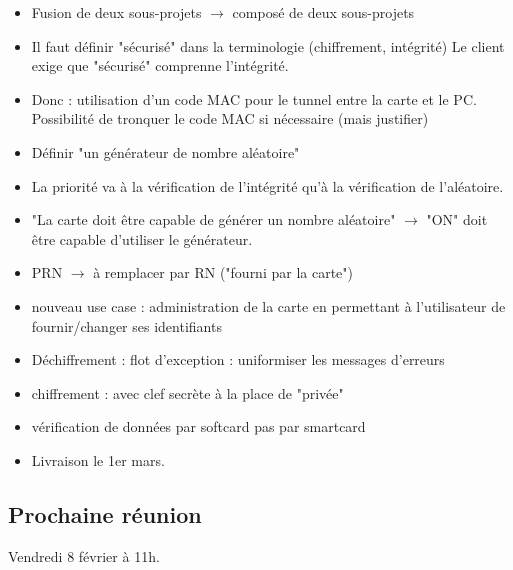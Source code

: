 \documentclass[a4paper,10pt]{article}
\begin{document}
\begin{itemize}
\item Fusion de deux sous-projets $\rightarrow$ composé de deux sous-projets
\item Il faut définir "sécurisé" dans la terminologie (chiffrement, intégrité)
Le client exige que "sécurisé" comprenne l'intégrité.
\item Donc : utilisation d'un code MAC pour le tunnel entre la carte et le PC.
Possibilité de tronquer le code MAC si nécessaire (mais justifier)
\item Définir "un générateur de nombre aléatoire"
\item La priorité va à la vérification de l'intégrité qu'à la vérification de 
l'aléatoire.
\item "La carte doit être capable de générer un nombre aléatoire" $\rightarrow$ 
"ON" doit être capable d'utiliser le générateur.
\item PRN $\rightarrow$ à remplacer par RN ("fourni par la carte")
\item nouveau use case : administration de la carte en permettant à l'utilisateur
de fournir/changer ses identifiants
\item Déchiffrement : flot d'exception : uniformiser les messages d'erreurs
\item chiffrement : avec clef secrète à la place de "privée"
\item vérification de données par softcard pas par smartcard
\item Livraison le 1er mars.
\end{itemize}

\subsection*{Prochaine réunion}
    Vendredi 8 février à 11h.    
    
\end{document}
